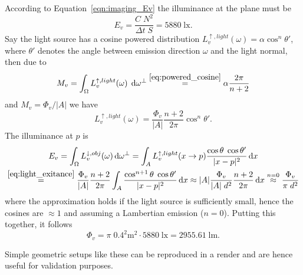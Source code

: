 According to Equation~\eqref{eqn:imaging_Ev} the illuminance at the plane must be 
\begin{displaymath}
  E_v = \frac{C\;N^2}{\Delta t\; S} = 5880\; \si{\lux}.
\end{displaymath}
Say the light source has a cosine powered distribution
$L_v^{\uparrow,light}(\omega) = \alpha \cos^n \theta'$, where
$\theta'$ denotes the angle between emission direction $\omega$ and
the light normal, then due to
\begin{displaymath}
  M_v = \int_\Omega L_v^{\uparrow,light}(\omega) \; \mathop{}\!\mathrm{d} \omega^\bot \stackrel{\eqref{eq:powered_cosine}}= \alpha \frac{2\pi}{n+2}
\end{displaymath}
and $M_v = \Phi_v / |A|$
we have
\begin{equation}\label{eq:light_exitance}
  L_v^{\uparrow,light}(\omega) = \frac{\Phi_v}{|A|} \frac{n+2}{2\pi} \cos^n \theta'.
\end{equation}
The illuminance at $p$ is
\begin{multline*}
  E_v = \int_\Omega L_v^{\downarrow,obj}(\omega) \mathop{}\!\mathrm{d}\omega^{\bot} = \int_A L_v^{\uparrow,light}(x\to p) \frac{\cos \theta\; \cos \theta'}{|x-p|^2} \mathop{}\!\mathrm{d} x \\
  \stackrel{\eqref{eq:light_exitance}} =  \frac{\Phi_v}{|A|} \frac{n+2}{2\pi} \int_A  \frac{\cos^{n+1} \theta\; \cos \theta'}{|x-p|^2} \mathop{}\!\mathrm{d} x
  \approx |A| \frac{ \Phi_v }{|A|\; d^2} \frac{n+2}{2\pi} \mathop{}\!\mathrm{d} x  \stackrel{n=0} \approx \frac{\Phi_v}{\pi\;d^2}
\end{multline*}
where the approximation holds if the light source is sufficiently small, hence the cosines are $\approx 1$ and assuming a Lambertian emission ($n=0$).
Putting this together, it follows 
\begin{displaymath}
  \Phi_v = \pi \; 0.4^2 \si{\square\meter}\cdot 5880\; \si{\lux} = 2955.61\; \si{\lumen}.
\end{displaymath}

Simple geometric setups like these can be reproduced in a render and are hence useful for validation purposes.
